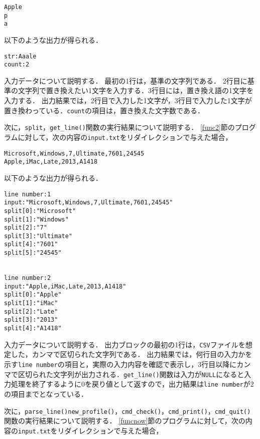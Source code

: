 {\fontsize{10pt}{11pt} \selectfont
 \begin{verbatim}
Apple
p
a
 \end{verbatim}
}

\noindent %
以下のような出力が得られる．

{\fontsize{10pt}{11pt} \selectfont
 \begin{verbatim}
str:Aaale
count:2
 \end{verbatim}
}

入力データについて説明する．
最初の1行は，基準の文字列である．
2行目に基準の文字列で置き換えたい1文字を入力する．3行目には，置き換え語の1文字を入力する．
出力結果では，2行目で入力した1文字が，3行目で入力した1文字が置き換わっている．\verb|count|の項目は，置き換えた文字数である．

次に，\verb|split|，\verb|get_line()|関数の実行結果について説明する．
\ref{func2}節のプログラムに対して，次の内容の\verb|input.txt|をリダイレクションで与えた場合，

{\fontsize{10pt}{11pt} \selectfont
 \begin{verbatim}
Microsoft,Windows,7,Ultimate,7601,24545
Apple,iMac,Late,2013,A1418
 \end{verbatim}
}

\noindent %
以下のような出力が得られる．

{\fontsize{10pt}{11pt} \selectfont
 \begin{verbatim}
line number:1
input:"Microsoft,Windows,7,Ultimate,7601,24545"
split[0]:"Microsoft"
split[1]:"Windows"
split[2]:"7"
split[3]:"Ultimate"
split[4]:"7601"
split[5]:"24545"


line number:2
input:"Apple,iMac,Late,2013,A1418"
split[0]:"Apple"
split[1]:"iMac"
split[2]:"Late"
split[3]:"2013"
split[4]:"A1418"
 \end{verbatim}
}

入力データについて説明する．
出力ブロックの最初の1行は，\verb|CSV|ファイルを想定した，カンマで区切られた文字列である．
出力結果では，何行目の入力かを示す\verb|line number|の項目と，実際の入力内容を確認で表示し，3行目以降にカンマで区切られた文字列が出力される．\verb|get_line()|関数は入力が\verb|NULL|になると入力処理を終了するように$0$を戻り値として返すので，出力結果は\verb|line number|が$2$の項目までとなっている．

次に，\verb|parse_line()|\verb|new_profile()|，\verb|cmd_check()|，\verb|cmd_print()|，\verb|cmd_quit()|関数の実行結果について説明する．
\ref{funcnow}節のプログラムに対して，次の内容の\verb|input.txt|をリダイレクションで与えた場合，

